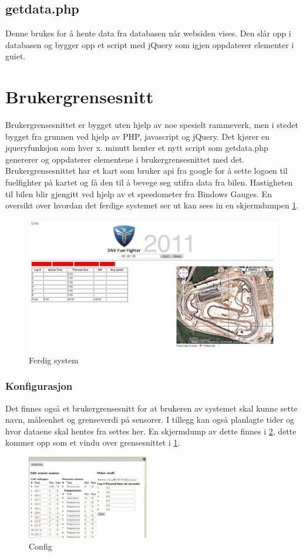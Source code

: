 \subsection{getdata.php}
Denne brukes for å hente data fra databasen når websiden vises. Den slår opp i databasen og bygger opp et script med jQuery\cite{jquery} som igjen oppdaterer elementer i guiet.
\section{Brukergrensesnitt}
Brukergrensesnittet er bygget uten hjelp av noe spesielt rammeverk, men i stedet bygget fra grunnen ved hjelp av PHP, javascript og jQuery\cite{jquery}. Det kjører en jqueryfunksjon som hver x. minutt henter et nytt script som getdata.php genererer og oppdaterer elementene i brukergrensesnittet med det. Brukergrensesnittet har et kart som bruker api fra google for å sette logoen til fuelfighter på kartet og få den til å bevege seg utifra data fra bilen. Hastigheten til bilen blir gjengitt ved hjelp av et speedometer fra Bindows Gauges\cite{bindows}. En oversikt over hvordan det ferdige systemet ser ut kan sees in en skjermdumpen \ref{gui}.
\begin{figure}[H]
\caption{Ferdig system} 
\label{gui}
\includegraphics[width=\textwidth]{images/gui.png}
\end{figure}
\subsubsection{Konfigurasjon}
Det finnes også et brukergrensesnitt for at brukeren av systemet skal kunne sette navn, måleenhet og grenseverdi på sensorer. I tillegg kan også planlagte tider og hvor dataene skal hentes fra settes her.
En skjermdump av dette finnes i \ref{config}, dette kommer opp som et vindu over grensesnittet i \ref{gui}.
\begin{figure}[H]
\caption{Config} 
\label{config}
\includegraphics[width=200px]{images/config.png}
\end{figure}


